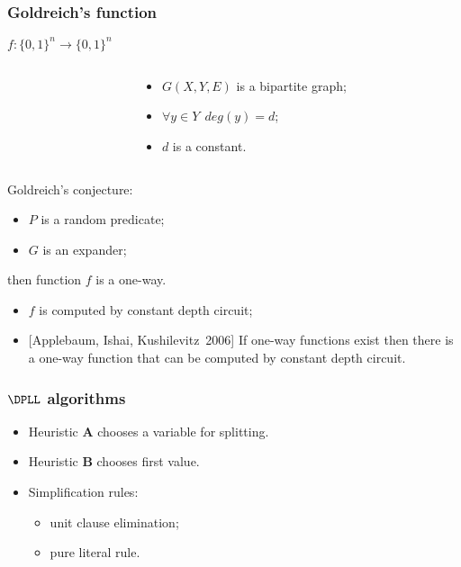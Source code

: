 \begin{frame}
	\frametitle{Goldreich's function}
	$f\colon \{0, 1\}^n \rightarrow \{0, 1\}^n$

    \pause

    \begin{columns}
    	\begin{column}{5.5cm}
            
        \end{column}

        \pause
        \pause
        \begin{column}{5.5cm}
            \begin{itemize}
	            \item $G(X, Y, E)$ is a bipartite graph;
            	\pause
                \item $\forall y \in Y ~~ deg(y) = d$;
            	\pause
            	\item $d$ is a constant.
            \end{itemize}
        \end{column}
	\end{columns}
    
	\pause

    Goldreich's conjecture:
    \begin{itemize}
	    \item $P$ is a random predicate;
    	\item $G$ is an expander;
    \end{itemize}
    then function $f$ is a one-way.

    \pause
    \begin{itemize}
	    \item $f$ is computed by constant depth circuit;
    	\pause
	    \item{} [Applebaum, Ishai, Kushilevitz~2006] If one-way
		    functions exist then there is a one-way function that can
            be computed by constant depth circuit.
    \end{itemize}
\end{frame}

\begin{frame}
	\frametitle{$\DPLL$ algorithms}

    \begin{center}
       	        
    \end{center}

    
	\pause
    \pause
    \pause
    \pause
    \pause
    \begin{itemize}
        \item Heuristic $\mathbf{A}$ chooses a variable for splitting.
    	\pause
	    \item Heuristic $\mathbf{B}$ chooses first value.
    	\pause
    	\item Simplification rules:
	    \begin{itemize}
            \item unit clause elimination;
        	\item pure literal rule.
    	\end{itemize}
    \end{itemize}

\end{frame}

